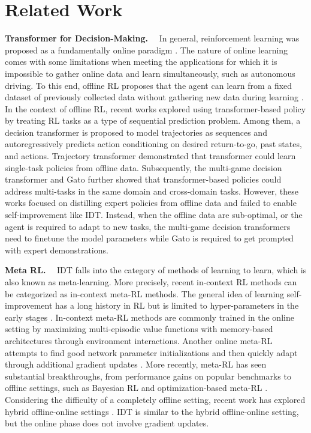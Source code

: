 \section{Related Work}

\noindent\textbf{Transformer for Decision-Making.}~~
In general, reinforcement learning was proposed as a fundamentally online paradigm \cite{38}. The nature of online learning comes with some limitations when meeting the applications for which it is impossible to gather online data and learn simultaneously, such as autonomous driving. To this end, offline RL proposes that the agent can learn from a fixed dataset of previously collected data without gathering new data during learning \cite{39,40,41,42}. In the context of offline RL, recent works explored using transformer-based policy by treating RL tasks as a type of sequential prediction problem. Among them, a decision transformer \cite{2} is proposed to model trajectories as sequences and autoregressively predicts action conditioning on desired return-to-go, past states, and actions. Trajectory transformer \cite{43} demonstrated that transformer could learn single-task policies from offline data. Subsequently, the multi-game decision transformer \cite{14} and Gato \cite{27} further showed that transformer-based policies could address multi-tasks in the same domain and cross-domain tasks. However, these works focused on distilling expert policies from offline data and failed to enable self-improvement like IDT. Instead, when the offline data are sub-optimal, or the agent is required to adapt to new tasks, the multi-game decision transformers need to finetune the model parameters while Gato is required to get prompted with expert demonstrations.

\noindent\textbf{Meta RL.}~~
IDT falls into the category of methods of learning to learn, which is also known as meta-learning. More precisely, recent in-context RL methods can be categorized as in-context meta-RL methods. The general idea of learning self-improvement has a long history in RL but is limited to hyper-parameters in the early stages \cite{31}. In-context meta-RL methods \cite{33,32} are commonly trained in the online setting by maximizing multi-episodic value functions with memory-based architectures through environment interactions. Another online meta-RL attempts to find good network parameter initializations and then quickly adapt through additional gradient updates \cite{46,45}. More recently, meta-RL has seen substantial breakthroughs, from performance gains on popular benchmarks to offline settings, such as Bayesian RL \cite{36} and optimization-based meta-RL \cite{37}. Considering the difficulty of a completely offline setting, recent work has explored hybrid offline-online settings \cite{34,35}. IDT is similar to the hybrid offline-online setting, but the online phase does not involve gradient updates.

